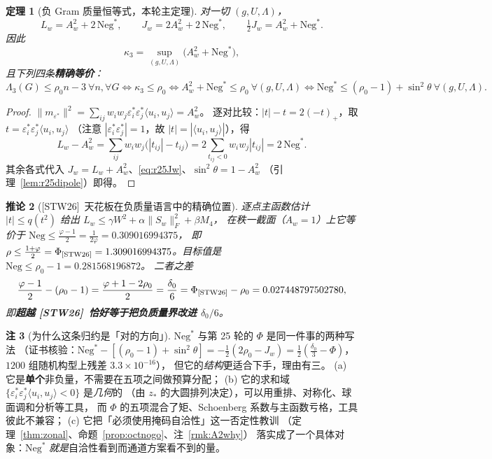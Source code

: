 \documentclass[UTF8,11pt]{ctexart}
\newtheorem{theorem}{定理}[section]
\newtheorem{corollary}[theorem]{推论}
\theoremstyle{definition}
\newtheorem{remark}[theorem]{注}
\newcommand{\Lam}{\Lambda}
\newcommand{\STW}{\textup{[STW26]}}
\begin{document}
\begin{theorem}[负 Gram 质量恒等式，本轮主定理]\label{thm:r26neg}
对一切 $(g,U,\Lam)$，
\begin{equation}\label{eq:r26neg1}
L_w=A_w^2+2\,\mathrm{Neg}^*,\qquad
J_w=2A_w^2+2\,\mathrm{Neg}^*,\qquad
\tfrac12J_w=A_w^2+\mathrm{Neg}^* .
\end{equation}
因此
\begin{equation}\label{eq:r26neg2}
\kappa_3=\sup_{(g,U,\Lam)}\bigl(A_w^2+\mathrm{Neg}^*\bigr),
\end{equation}
且下列四条\textbf{精确等价}：
\begin{equation}\label{eq:r26neg3}
\Lam_3(G)\le\rho_0n-3\ \forall n,\forall G
\iff\kappa_3\le\rho_0
\iff A_w^2+\mathrm{Neg}^*\le\rho_0\ \forall(g,U,\Lam)
\iff\mathrm{Neg}^*\le(\rho_0-1)+\sin^2\theta\ \forall(g,U,\Lam).
\end{equation}
\end{theorem}

\begin{proof}
$\|m_{\varepsilon^*}\|^2=\sum_{ij}w_iw_j\varepsilon_i^*\varepsilon_j^*\langle u_i,u_j\rangle=A_w^2$。
逐对比较：$|t|-t=2(-t)_+$，取 $t=\varepsilon_i^*\varepsilon_j^*\langle u_i,u_j\rangle$
（注意 $|\varepsilon_i^*\varepsilon_j^*|=1$，故 $|t|=|\langle u_i,u_j\rangle|$），得
\[
L_w-A_w^2=\sum_{ij}w_iw_j\bigl(|t_{ij}|-t_{ij}\bigr)
=2\sum_{t_{ij}<0}w_iw_j|t_{ij}|=2\,\mathrm{Neg}^* .
\]
其余各式代入 $J_w=L_w+A_w^2$、\eqref{eq:r25Jw}、$\sin^2\theta=1-A_w^2$
（引理~\ref{lem:r25dipole}）即得。
\end{proof}

\begin{corollary}[\STW\ 天花板在负质量语言中的精确位置]\label{cor:r26stw}
逐点主函数估计 $|t|\le q(t^2)$ 给出 $L_w\le\gamma W^2+\alpha\|S_w\|_F^2+\beta M_4$，
在秩一截面（$A_w=1$）上它等价于 $\mathrm{Neg}\le\frac{\varphi-1}2=\frac1{2\varphi}=0.309016994375$，
即 $\rho\le\frac{1+\varphi}2=\Phi_{\STW}=1.309016994375$。目标值是 $\mathrm{Neg}\le\rho_0-1=0.281568196872$。
二者之差
\begin{equation}\label{eq:r26gap}
\frac{\varphi-1}2-(\rho_0-1)=\frac{\varphi+1-2\rho_0}2=\frac{\delta_0}6
=\Phi_{\STW}-\rho_0=0.027448797502780 ,
\end{equation}
即\textbf{超越 \STW\ 恰好等于把负质量界改进 $\delta_0/6$}。
\end{corollary}

\begin{remark}[为什么这条归约是「对的方向」]\label{rem:r26why}
$\mathrm{Neg}^*$ 与第 25 轮的 $\Phi$ 是同一件事的两种写法
（证书核验：$\mathrm{Neg}^*-[(\rho_0-1)+\sin^2\theta]=-\frac12(2\rho_0-J_w)=\frac12(\frac{\delta_0}3-\Phi)$，
$1200$ 组随机构型上残差 $3.3\times10^{-16}$），
但它的\emph{结构}更适合下手，理由有三。
(a) 它是\textbf{单个}非负量，不需要在五项之间做预算分配；
(b) 它的求和域 $\{\varepsilon_i^*\varepsilon_j^*\langle u_i,u_j\rangle<0\}$ 是\emph{几何}的
（由 $z_*$ 的大圆排列决定），可以用重排、对称化、球面调和分析等工具，
而 $\Phi$ 的五项混合了矩、Schoenberg 系数与主函数亏格，工具彼此不兼容；
(c) 它把「必须使用掩码自洽性」这一否定性教训
（定理~\ref{thm:zonal}、命题~\ref{prop:octnogo}、注~\ref{rmk:A2why}）
落实成了一个具体对象：$\mathrm{Neg}^*$ \emph{就是}自洽性看到而通道方案看不到的量。
\end{remark}
\end{document}
